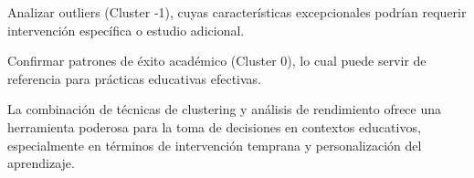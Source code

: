 \documentclass{article}
\begin{document}
Analizar outliers (Cluster -1), cuyas características excepcionales podrían requerir intervención específica o estudio adicional.

Confirmar patrones de éxito académico (Cluster 0), lo cual puede servir de referencia para prácticas educativas efectivas.

La combinación de técnicas de clustering y análisis de rendimiento ofrece una herramienta poderosa para la toma de decisiones en contextos educativos, especialmente en términos de intervención temprana y personalización del aprendizaje.

%
%



\end{document}
